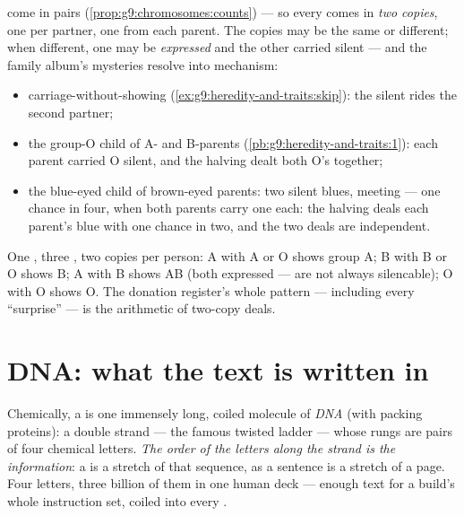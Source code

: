 \begin{proposition}\label{prop:g9:genes-and-dna:twocopies}
 come in pairs
(\cref{prop:g9:chromosomes:counts}) --- so every 
comes in \emph{two copies}, one per partner, one from each
parent. The copies may be the same  or different;
when different, one may be \emph{expressed} and the other
carried silent --- and the family album's mysteries
resolve into mechanism:
\begin{itemize}
  \item carriage-without-showing
        (\cref{ex:g9:heredity-and-traits:skip}): the
        silent  rides the second partner;
  \item the group-O child of A- and B-parents
        (\cref{pb:g9:heredity-and-traits:1}): each parent
        carried O silent, and the halving dealt both O's
        together;
  \item the blue-eyed child of brown-eyed parents: two
        silent blues, meeting --- one chance in four, when
        both parents carry one each: the halving deals
        each parent's blue with one chance in two, and the
        two deals are independent.
\end{itemize}
\end{proposition}
\admitted

\begin{example}\label{ex:g9:genes-and-dna:bloodgroups}
One , three , two copies per person: A with A
or O shows group A; B with B or O shows B; A with B shows
AB (both expressed ---  are not always
silencable); O with O shows O. The donation register's
whole pattern --- including every ``surprise'' --- is the
arithmetic of two-copy deals.
\end{example}

\section{DNA: what the text is written in}

\begin{definition}[DNA]\label{def:g9:genes-and-dna:dna}
Chemically, a  is one immensely long, coiled
molecule of \emph{DNA} (with packing proteins):
a double strand --- the famous twisted ladder --- whose
rungs are pairs of four chemical letters. \emph{The order
of the letters along the strand is the information}: a
 is a stretch of that sequence, as a sentence is a
stretch of a page. Four letters, three billion of them in
one human deck --- enough text for a build's whole
instruction set, coiled into every .
\end{definition}

